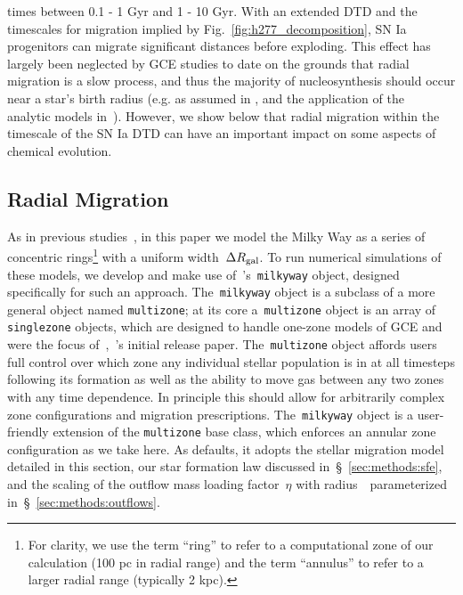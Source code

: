 \documentclass[draft2.tex]{subfiles}
\begin{document}
times between 0.1 - 1 Gyr and 1 - 10 Gyr. 
With an extended DTD and the timescales for migration implied by 
Fig.~\ref{fig:h277_decomposition}, SN Ia progenitors can migrate significant 
distances before exploding. 
This effect has largely been neglected by GCE studies to date on the grounds 
that radial migration is a slow process, and thus the majority of 
nucleosynthesis should occur near a star's birth radius (e.g. as assumed in 
\citealp{Minchev2013}, and the application of the~\citealp*{Weinberg2017} 
analytic models in~\citealp{Feuillet2018}). 
However, we show below that radial migration within the timescale of the SN Ia 
DTD can have an important impact on some aspects of chemical evolution. 

\subsection{Radial Migration} 
\label{sec:methods:migration} 
As in previous studies~\citep[e.g.][]{Matteucci1989, Schoenrich2009a, 
Minchev2013, Sharma2020}, in this paper we model the Milky Way as a series of 
concentric rings\footnote{
	For clarity, we use the term ``ring'' to refer to a computational zone of 
	our calculation (100 pc in radial range) and the term ``annulus'' to refer 
	to a larger radial range (typically 2 kpc). 
} with a uniform width~$\Delta R_\text{gal}$. 
To run numerical simulations of these models, we develop and make use 
of~\vice's~\texttt{milkyway} object, designed specifically for such an 
approach. 
The~\texttt{milkyway} object is a subclass of a more general object named 
\texttt{multizone}; at its core a~\texttt{multizone} object is an array of 
\texttt{singlezone} objects, which are designed to handle one-zone models of 
GCE and were the focus of~\citet{Johnson2020},~\vice's initial release paper. 
The~\texttt{multizone} object affords users full control over which zone any 
individual stellar population is in at all timesteps following its formation as 
well as the ability to move gas between any two zones with any time dependence. 
In principle this should allow for arbitrarily complex zone configurations and 
migration prescriptions. 
The~\texttt{milkyway} object is a user-friendly extension of the 
\texttt{multizone} base class, which enforces an annular zone configuration as 
we take here. 
As defaults, it adopts the stellar migration model detailed in this section, 
our star formation law discussed in~\S~\ref{sec:methods:sfe}, and the scaling 
of the outflow mass loading factor~$\eta$ with radius~\rgal~parameterized 
in~\S~\ref{sec:methods:outflows}. 
\end{document}

